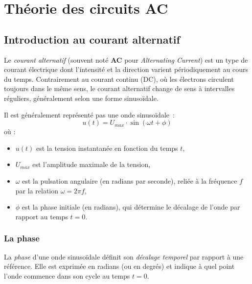 \chapter{Th\'eorie des circuits AC} \label{subsec:ac_circuit_theory}

\section{Introduction au courant alternatif} \label{subsec:intro_ac}
Le \emph{courant alternatif} (souvent not\'e \textbf{AC} pour \emph{Alternating Current}) est un type de courant \'electrique dont l’intensit\'e et la direction varient p\'eriodiquement au cours du temps. Contrairement au courant continu (DC), où les \'electrons circulent toujours dans le même sens, le courant alternatif change de sens à intervalles r\'eguliers, g\'en\'eralement selon une forme sinuso\"idale.\par
Il est g\'en\'eralement repr\'esent\'e pas une onde sinuso\"idale~:
\[
    u(t) = U_{max} \cdot \sin(\omega t + \phi)
\]
o\`u :
\begin{itemize}
    \item $u(t)$ est la tension instantan\'ee en fonction du temps $t$,
    \item $U_{max}$ est l'amplitude maximale de la tension,
    \item $\omega$ est la pulsation angulaire (en radians par seconde), reli\'ee à la fr\'equence $f$ par la relation $\omega = 2\pi f$,
    \item $\phi$ est la phase initiale (en radians), qui d\'etermine le d\'ecalage de l'onde par rapport au temps $t = 0$.
\end{itemize}

\subsection{La phase}
La \emph{phase} d'une onde sinuso\"idale d\'efinit son \emph{d\'ecalage temporel} par rapport à une r\'ef\'erence. Elle est exprim\'ee en radians (ou en degr\'es) et indique \`a quel point l'onde commence dans son cycle au temps $t = 0$.\par

